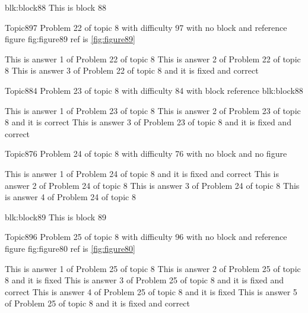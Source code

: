 \documentclass[master]{exam}
\begin{document}
\begin{block}{blk:block88}
This is block 88
\end{block}


\begin{problem}{Topic8}{97}
	Problem 22 of topic 8 with difficulty 97 with no block and reference figure fig:figure89 ref is \ref{fig:figure89}
	\begin{answers}
		\answer This is answer 1 of Problem 22 of topic 8 
		\answer This is answer 2 of Problem 22 of topic 8 
		 This is answer 3 of Problem 22 of topic 8 and it is fixed and correct
	\end{answers}
\end{problem}

\begin{problem}[requires=blk:block88]{Topic8}{84}
	Problem 23 of topic 8 with difficulty 84 with block reference blk:block88
	\begin{answers}
		\answer This is answer 1 of Problem 23 of topic 8 
		\answer[correct] This is answer 2 of Problem 23 of topic 8 and it is correct
		 This is answer 3 of Problem 23 of topic 8 and it is fixed and correct
	\end{answers}
\end{problem}

\begin{problem}{Topic8}{76}
	Problem 24 of topic 8 with difficulty 76 with no block and no figure
	\begin{answers}
		 This is answer 1 of Problem 24 of topic 8 and it is fixed and correct
		\answer This is answer 2 of Problem 24 of topic 8 
		\answer This is answer 3 of Problem 24 of topic 8 
		\answer This is answer 4 of Problem 24 of topic 8 
	\end{answers}
\end{problem}



\begin{block}{blk:block89}
This is block 89
\end{block}


\begin{problem}{Topic8}{96}
	Problem 25 of topic 8 with difficulty 96 with no block and reference figure fig:figure80 ref is \ref{fig:figure80}
	\begin{answers}
		\answer This is answer 1 of Problem 25 of topic 8 
		\answer[fixed] This is answer 2 of Problem 25 of topic 8 and it is fixed
		 This is answer 3 of Problem 25 of topic 8 and it is fixed and correct
		\answer[fixed] This is answer 4 of Problem 25 of topic 8 and it is fixed
		 This is answer 5 of Problem 25 of topic 8 and it is fixed and correct
	\end{answers}
\end{problem}
\end{document}
